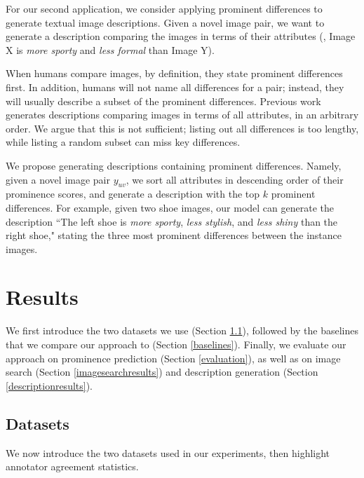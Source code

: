 \documentclass[10pt,twocolumn,letterpaper]{article}
\begin{document}
For our second application, we consider applying prominent differences to generate textual image descriptions. Given a novel image pair, we want to generate a description comparing the images in terms of their attributes (\eg, Image X is \textit{more sporty} and \textit{less formal} than Image Y).

When humans compare images, by definition, they state prominent differences first. In addition, humans will not name all differences for a pair; instead, they will usually describe a subset of the prominent differences. Previous work~\cite{relativeattributes, spokenattributes} generates descriptions comparing images in terms of all attributes, in an arbitrary order. We argue that this is not sufficient; listing out all differences is too lengthy, while listing a random subset can miss key differences.

We propose generating descriptions containing prominent differences. Namely, given a novel image pair $y_{uv}$, we sort all attributes in descending order of their prominence scores, and generate a description with the top $k$ prominent differences. For example, given two shoe images, our model can generate the description ``The left shoe is \textit{more sporty}, \textit{less stylish}, and \textit{less shiny} than the right shoe," stating the three most prominent differences between the instance images.



\section{Results} \label{results}

We first introduce the two datasets we use (Section \ref{datasets}), followed by the baselines that we compare our approach to (Section \ref{baselines}). Finally, we evaluate our approach on prominence prediction (Section \ref{evaluation}), as well as on image search (Section \ref{imagesearchresults}) and description generation (Section \ref{descriptionresults}).


\subsection{Datasets} \label{datasets}

We now introduce the two datasets used in our experiments, then highlight annotator agreement statistics.

\vspace{0.25cm}
\end{document}
